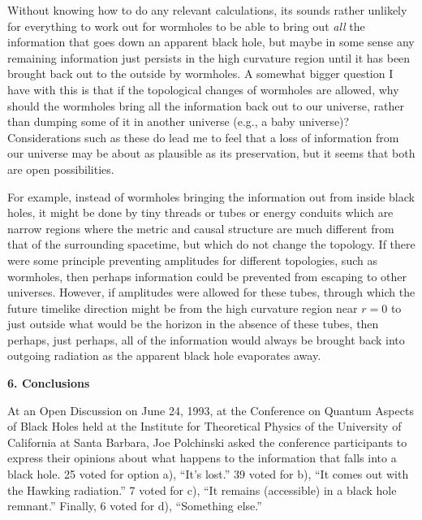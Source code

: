 \documentclass[12pt]{article}
\begin{document}
	Without knowing how to do any relevant calculations, its
sounds rather
unlikely for everything to work out for wormholes to be able to bring
out {\it
all} the information that goes down an apparent black hole, but maybe
in some
sense any remaining information just persists in the high curvature
region
until it has been brought back out to the outside by wormholes.  A
somewhat
bigger question I have with this is that if the topological changes
of
wormholes
are allowed, why should the wormholes bring all the information back
out to our
universe, rather than dumping some of it in another universe (e.g., a
baby
universe)?  Considerations such as these do lead me to feel that a
loss of
information from our universe may be about as plausible as its
preservation,
but it seems that both are open possibilities.

	For example, instead of wormholes bringing the information
out from
inside black holes, it might be done by tiny threads or tubes or
energy
conduits
which are narrow regions
where the metric and causal structure are much different from that of
the
surrounding spacetime, but which do not change the topology.  If
there were
some principle preventing amplitudes for different topologies, such
as
wormholes, then perhaps information could be prevented from escaping
to other
universes.  However, if amplitudes were allowed for these tubes,
through which
the future timelike direction might be from the high curvature region
near
$r=0$ to just outside what would be the horizon in the absence of
these tubes,
then perhaps, just perhaps, all of the information would always be
brought back
into outgoing radiation as the apparent black hole evaporates away.

\vspace{5 mm}
{\bf 6.  Conclusions}
\vspace{5 mm}

	At an Open Discussion on June 24, 1993, at the Conference on
Quantum
Aspects of Black Holes held at the Institute for Theoretical Physics
of the
University
of California at Santa Barbara, Joe Polchinski asked the conference
participants
to express their opinions about what happens to the information that
falls into
a black hole.  25 voted for option a), ``It's lost.''  39 voted for
b), ``It
comes
out with the Hawking radiation.''  7 voted for c), ``It remains
(accessible) in
a
black hole remnant.''  Finally, 6 voted for d), ``Something else.''
\end{document}
